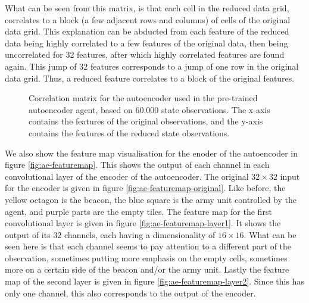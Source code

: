 What can be seen from this matrix, is that each cell in the reduced data grid, correlates to a block (a few adjacent rows and columns) of cells of the original data grid. This explanation can be abducted from each feature of the reduced data being highly correlated to a few features of the original data, then being uncorrelated for $32$ features, after which highly correlated features are found again. This jump of $32$ features corresponds to a jump of one row in the original data grid. Thus, a reduced feature correlates to a block of the original features.

\begin{figure}
	\centering
	\caption{Correlation matrix for the autoencoder used in the pre-trained autoencoder agent, based on $60.000$ state observations. The x-axis contains the features of the original observations, and the y-axis contains the features of the reduced state observations.}
	\label{fig:ae-corr}
\end{figure}

We also show the feature map visualisation for the enoder of the autoencoder in figure \ref{fig:ae-featuremap}. This shows the output of each channel in each convolutional layer of the encoder of the autoencoder. The original $32 \times 32$ input for the encoder is given in figure \ref{fig:ae-featuremap-original}. Like before, the yellow octagon is the beacon, the blue square is the army unit controlled by the agent, and purple parts are the empty tiles. The feature map for the first convolutional layer is given in figure \ref{fig:ae-featuremap-layer1}. It shows the output of its $32$ channels, each having a dimensionality of $16 \times 16$. What can be seen here is that each channel seems to pay attention to a different part of the observation, sometimes putting more emphasis on the empty cells, sometimes more on a certain side of the beacon and/or the army unit. Lastly the feature map of the second layer is given in figure \ref{fig:ae-featuremap-layer2}. Since this has only one channel, this also corresponds to the output of the encoder. 


